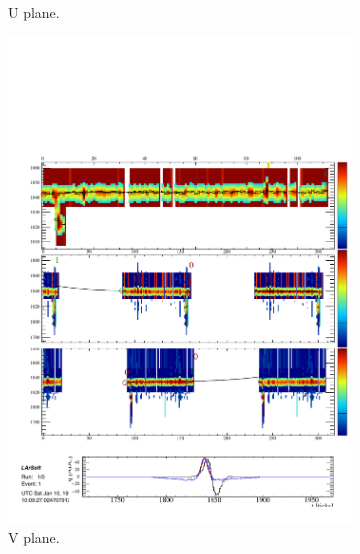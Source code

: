 \begin{figure}
\begin{subfigure}[t]{0.3\linewidth}
    \caption{U plane.}
    \label{fig:HitFindingU}
  \end{subfigure}
  \hfill
  \begin{subfigure}[t]{0.3\linewidth}
    \centering
    \includegraphics[width=\textwidth]{HitFindingV.pdf}
    \caption{V plane.}
    \label{fig:HitFindingV}
  \end{subfigure}
  \hfill
  \begin{subfigure}[t]{0.3\linewidth}
    \centering

\end{subfigure}
\end{figure}
